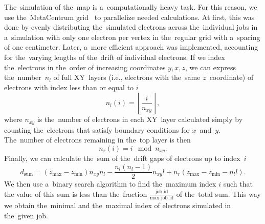 		The~simulation of the~map is a~computationally heavy task. For this reason, we use the~MetaCentrum grid~\cite{metacentrum} to parallelize needed calculations. At first, this was done by evenly distributing the~simulated electrons across the~individual jobs in a~simulation with only one electron per vertex in the~regular grid with a~spacing of one centimeter. Later, a~more efficient approach was implemented, accounting for the~varying lengths of the~drift of individual electrons. If we index the~electrons in the~order of increasing coordinates $y,x,z$, we can express the~number~$n_l$ of full XY~layers (i.e., electrons with the~same $z$~coordinate) of electrons with index less than or equal to $i$
			\begin{equation}
				n_l(i) = \left\lfloor\frac{i}{n_{xy}}\right\rfloor,
			\end{equation}
		where $n_{xy}$ is the~number of electrons in each XY~layer calculated simply by counting the~electrons that satisfy boundary conditions for $x$~and~$y$. The~number of electrons remaining in the~top layer is then
			\begin{equation}
				n_r(i) = i\!\!\!\!\mod n_{xy}.
			\end{equation}
		Finally, we can calculate the~sum of the~drift gaps of electrons up to index~$i$
			\begin{equation}
				d_\text{sum} = (z_\text{max}-z_\text{min})n_{xy}n_l-\frac{n_l(n_l-1)}{2}n_{xy}l+n_r(z_\text{max}-z_\text{min}-n_l l).
			\end{equation}
		We then use a~binary search algorithm to find the~maximum index $i$ such that the value of this sum is less than the~fraction $\frac{\text{job id}}{\text{max job id}}$ of the~total sum. This way we obtain the~minimal and the~maximal index of electrons simulated in the~given job.
		
		

